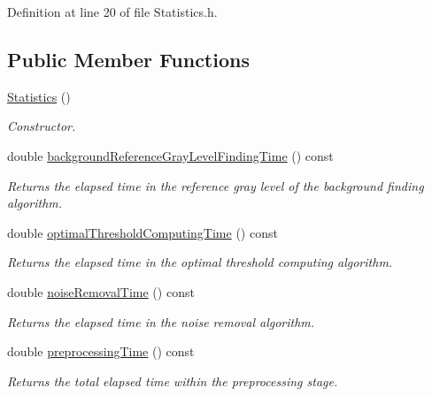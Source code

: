 Definition at line 20 of file Statistics.h.\subsection*{Public Member Functions}
\begin{CompactItemize}
\item 
\hyperlink{class_statistics_60ddd90a571ed4c3ce8c0f6317a36d63}{Statistics} ()
\begin{CompactList}\small\item\em Constructor. \item\end{CompactList}\item 
double \hyperlink{class_statistics_565e90b1940d12bb2a2661f6dcea230d}{backgroundReferenceGrayLevelFindingTime} () const 
\begin{CompactList}\small\item\em Returns the elapsed time in the reference gray level of the background finding algorithm. \item\end{CompactList}\item 
double \hyperlink{class_statistics_ca10ccbc4137e9ad184ff6dc9a3e5a46}{optimalThresholdComputingTime} () const 
\begin{CompactList}\small\item\em Returns the elapsed time in the optimal threshold computing algorithm. \item\end{CompactList}\item 
double \hyperlink{class_statistics_25b35c7f7f33d55ee86f4e7ba6cd0c48}{noiseRemovalTime} () const 
\begin{CompactList}\small\item\em Returns the elapsed time in the noise removal algorithm. \item\end{CompactList}\item 
double \hyperlink{class_statistics_d88deb57349fedd7035ccffa06b4859b}{preprocessingTime} () const 
\begin{CompactList}\small\item\em Returns the total elapsed time within the preprocessing stage. \item\end{CompactList}\end{CompactItemize}
